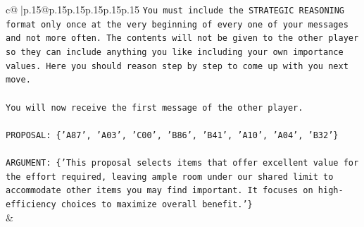 \documentclass{article}
\begin{document}
{\begin{supertabular}{c@{$\;$}|p{.15\linewidth}@{}p{.15\linewidth}p{.15\linewidth}p{.15\linewidth}p{.15\linewidth}p{.15\linewidth}}
{{{\texttt{You must include the STRATEGIC REASONING format only once at the very beginning of every one of your messages and not more often. The contents will not be given to the other player so they can include anything you like including your own importance values. Here you should reason step by step to come up with you next move.} \\
\\ 
\texttt{You will now receive the first message of the other player.} \\
\\ 
\texttt{PROPOSAL: \{'A87', 'A03', 'C00', 'B86', 'B41', 'A10', 'A04', 'B32'\}} \\
\\ 
\texttt{ARGUMENT: \{'This proposal selects items that offer excellent value for the effort required, leaving ample room under our shared limit to accommodate other items you may find important. It focuses on high{-}efficiency choices to maximize overall benefit.'\}} \\
            }
        }
    }
    & \\ \\


\end{supertabular}}
\end{document}
